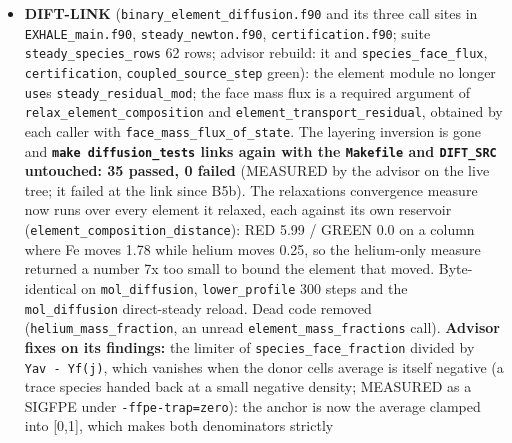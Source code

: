 \documentclass[english,a4paper]{my_memo}
\begin{document}
\begin{itemize}
  sweep is serial (untrue since the parallelization; its arrays are
  threadprivate); the \texttt{carrier\_base\_state} citation of
  \texttt{ionization\_equilibrium.f90} rewritten to \texttt{carrier\_base\_composition\_imposed}.
  Recorded: \texttt{he\_ground\_singlet\_density}\textquotesingle s clamp counter needs a lock when
  the self-field loop runs (a slot per cell would be free,
  \texttt{composition.f90}); \texttt{f\_vib\_quench}/\texttt{e\_vib\_bound} stay at the entry
  composition inside the loop; the COST3 attribution in that report, its
  log entry above and the \texttt{csm\_max\_pass} comment of \texttt{EXHALE\_main.f90} are
  superseded by this measurement (comment to be corrected when DIFT-LINK
  releases main).
\item
  \textbf{DIFT-LINK} (\texttt{binary\_element\_diffusion.f90} and its three call sites in
  \texttt{EXHALE\_main.f90}, \texttt{steady\_newton.f90}, \texttt{certification.f90}; suite
  \texttt{steady\_species\_rows} 62 rows; advisor rebuild: it and \texttt{species\_face\_flux},
  \texttt{certification}, \texttt{coupled\_source\_step} green): the element module no longer
  \texttt{use}s \texttt{steady\_residual\_mod}; the face mass flux is a required argument of
  \texttt{relax\_element\_composition} and \texttt{element\_transport\_residual}, obtained by
  each caller with \texttt{face\_mass\_flux\_of\_state}. The layering inversion is gone
  and \textbf{\texttt{make\ diffusion\_tests} links again with the \texttt{Makefile} and \texttt{DIFT\_SRC}
  untouched: 35 passed, 0 failed} (MEASURED by the advisor on the live
  tree; it failed at the link since B5b). The relaxation\textquotesingle s convergence
  measure now runs over every element it relaxed, each against its own
  reservoir (\texttt{element\_composition\_distance}): RED 5.99 / GREEN 0.0 on a
  column where Fe moves 1.78 while helium moves 0.25, so the helium-only
  measure returned a number 7x too small to bound the element that moved.
  Byte-identical on \texttt{mol\_diffusion}, \texttt{lower\_profile} 300 steps and the
  \texttt{mol\_diffusion} direct-steady reload. Dead code removed
  (\texttt{helium\_mass\_fraction}, an unread \texttt{element\_mass\_fractions} call).
  \textbf{Advisor fixes on its findings:} the limiter of \texttt{species\_face\_fraction}
  divided by \texttt{Yav\ -\ Yf(j)}, which vanishes when the donor cell\textquotesingle s average is
  itself negative (a trace species handed back at a small negative density;
  MEASURED as a SIGFPE under \texttt{-ffpe-trap=zero}): the anchor is now the
  average clamped into {[}0,1{]}, which makes both denominators strictly

\end{itemize}
\end{document}

